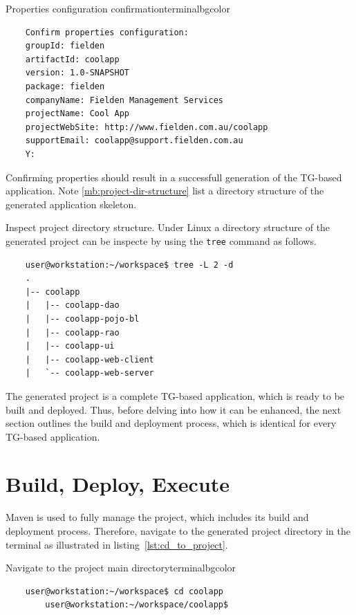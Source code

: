   \vspace*{-20pt}
  \begin{code}{Properties configuration confirmation}{\label{lst:properties_confirmation}}{terminalbgcolor}
      \begin{lstlisting}
	Confirm properties configuration:
	groupId: fielden
	artifactId: coolapp
	version: 1.0-SNAPSHOT
	package: fielden
	companyName: Fielden Management Services
	projectName: Cool App
	projectWebSite: http://www.fielden.com.au/coolapp
	supportEmail: coolapp@support.fielden.com.au
	Y:
      \end{lstlisting}
  \end{code}

  Confirming properties should result in a successfull generation of the TG-based application.
  Note \ref{mb:project-dir-structure} list a directory structure of the generated application skeleton.  

  \begin{notebox}{Inspect project directory structure.}{\label{mb:project-dir-structure}}
      Under Linux a directory structure of the generated project can be inspecte by using the \texttt{tree} command as follows.
	
      \begin{verbatim}
	user@workstation:~/workspace$ tree -L 2 -d
	.
	|-- coolapp
	|   |-- coolapp-dao
	|   |-- coolapp-pojo-bl
	|   |-- coolapp-rao
	|   |-- coolapp-ui
	|   |-- coolapp-web-client
	|   `-- coolapp-web-server
      \end{verbatim}
  \end{notebox}    
  
  The generated project is a complete TG-based application, which is ready to be built and deployed.
  Thus, before delving into how it can be enhanced, the next section outlines the build and deployment process, which is identical for every TG-based application.

\section{Build, Deploy, Execute}
  Maven is used to fully manage the project, which includes its build and deployment process.
  Therefore, navigate to the generated project directory in the terminal as illustrated in listing~\ref{lst:cd_to_project}.

  \vspace*{-20pt}
  \begin{code}{Navigate to the project main directory}{\label{lst:cd_to_project}}{terminalbgcolor}
      \begin{lstlisting}
	user@workstation:~/workspace$ cd coolapp
        user@workstation:~/workspace/coolapp$
      \end{lstlisting}
  \end{code}


